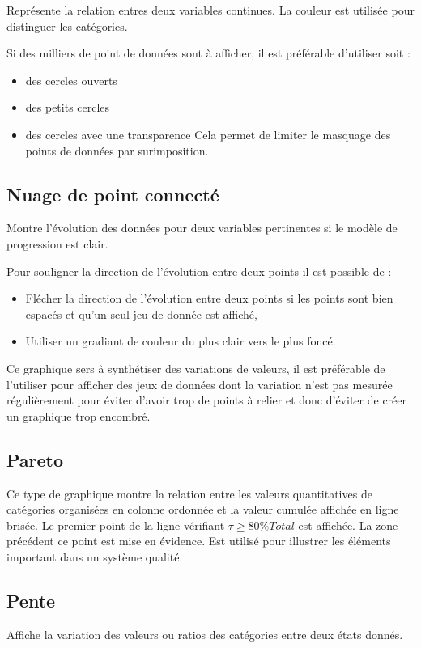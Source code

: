 \documentclass[a4paper,12pt]{article}
\begin{document}
\begin{multicols}{2}
Représente la relation entres deux variables continues. \autocite{alansmithLexiqueVisuel}
La couleur est utilisée pour distinguer les catégories.

Si des milliers de point de données sont à afficher, il est préférable d'utiliser soit :
\begin{itemize}
\item des cercles ouverts
\item des petits cercles
\item des cercles avec une transparence
Cela permet de limiter le masquage des points de données par surimposition. \autocite{andreaskrauseBestPracticesData2024}
\end{itemize}
\subsection*{Nuage de point connecté}
\label{sec:org8394d5a}
Montre l'évolution des données pour deux variables pertinentes si le modèle de progression est clair. \autocite{alansmithLexiqueVisuel}

Pour souligner la direction de l'évolution entre deux points il est possible de :
\begin{itemize}
\item Flécher la direction de l'évolution entre deux points si les points sont bien espacés et qu'un seul jeu de donnée est affiché, \autocite{jonathanschwabishComparingCategories2021}
\item Utiliser un gradiant de couleur du plus clair vers le plus foncé.
\end{itemize}

Ce graphique sers à synthétiser des variations de valeurs, il est préférable de l'utiliser pour afficher des jeux de données dont la variation n'est pas mesurée régulièrement pour éviter d'avoir trop de points à relier et donc d'éviter de créer un graphique trop encombré. \autocite{jonathanschwabishComparingCategories2021}
\subsection*{Pareto}
\label{sec:org2c34a26}
Ce type de graphique montre la relation entre les valeurs quantitatives de catégories organisées en colonne ordonnée et la valeur cumulée affichée en ligne brisée. Le premier point de la ligne vérifiant \(\tau\geq80\%Total\) est affichée. La zone précédent ce point est mise en évidence.
Est utilisé pour illustrer les éléments important dans un système qualité.
\subsection*{Pente}
\label{sec:org32b72dd}
Affiche la variation des valeurs ou ratios des catégories entre deux états donnés. \autocite{alansmithLexiqueVisuel}

\end{multicols}
\end{document}
